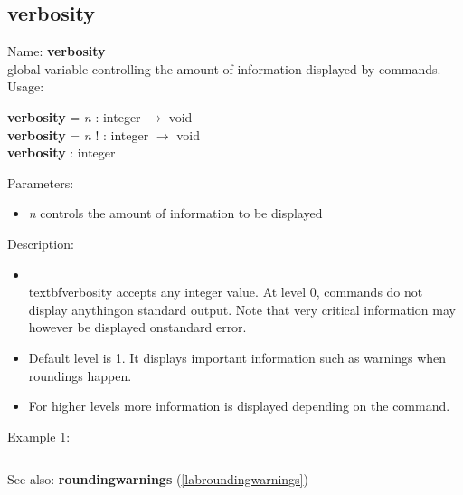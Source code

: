 \subsection{verbosity}
\label{labverbosity}
\noindent Name: \textbf{verbosity}\\
global variable controlling the amount of information displayed by commands.\\
\noindent Usage: 
\begin{center}
\textbf{verbosity} = \emph{n} : \textsf{integer} $\rightarrow$ \textsf{void}\\
\textbf{verbosity} = \emph{n} ! : \textsf{integer} $\rightarrow$ \textsf{void}\\
\textbf{verbosity} : \textsf{integer}\\
\end{center}
Parameters: 
\begin{itemize}
\item \emph{n} controls the amount of information to be displayed
\end{itemize}
\noindent Description: \begin{itemize}

\item \\textbf{verbosity} accepts any integer value. At level 0, commands do not display anything\n   on standard output. Note that very critical information may however be displayed on\n   standard error.\n
\item Default level is 1. It displays important information such as warnings when \n   roundings happen.\n
\item For higher levels more information is displayed depending on the command.\n\end{itemize}
\noindent Example 1: 
\begin{center}\begin{minipage}{15cm}\begin{Verbatim}[frame=single]
\end{Verbatim}
\end{minipage}\end{center}
See also: \textbf{roundingwarnings} (\ref{labroundingwarnings})
